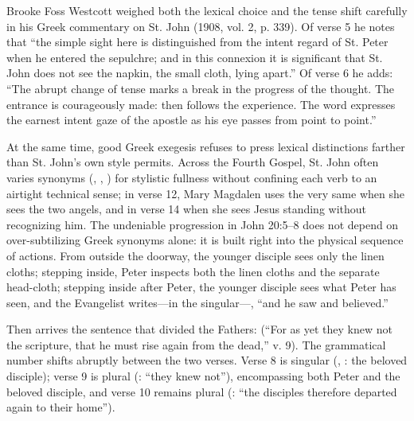 Brooke Foss Westcott weighed both the lexical choice and the tense shift carefully in his Greek commentary on St. John (1908, vol. 2, p. 339). Of verse 5 he notes that ``the simple sight here is distinguished from the intent regard of St. Peter when he entered the sepulchre; and in this connexion it is significant that St. John does not see the napkin, the small cloth, lying apart.'' Of verse 6 he adds: ``The abrupt change of tense marks a break in the progress of the thought. The entrance is courageously made: then follows the experience. The word expresses the earnest intent gaze of the apostle as his eye passes from point to point.''

At the same time, good Greek exegesis refuses to press lexical distinctions farther than St. John's own style permits. Across the Fourth Gospel, St. John often varies synonyms (, , ) for stylistic fullness without confining each verb to an airtight technical sense; in verse 12, Mary Magdalen uses the very same  when she sees the two angels, and in verse 14 when she sees Jesus standing without recognizing him. The undeniable progression in John 20:5--8 does not depend on over-subtilizing Greek synonyms alone: it is built right into the physical sequence of actions. From outside the doorway, the younger disciple sees only the linen cloths; stepping inside, Peter inspects both the linen cloths and the separate head-cloth; stepping inside after Peter, the younger disciple sees what Peter has seen, and the Evangelist writes---in the singular---, ``and he saw and believed.''

Then arrives the sentence that divided the Fathers:  (``For as yet they knew not the scripture, that he must rise again from the dead,'' v. 9). The grammatical number shifts abruptly between the two verses. Verse 8 is singular (, : the beloved disciple); verse 9 is plural (: ``they knew not''), encompassing both Peter and the beloved disciple, and verse 10 remains plural (: ``the disciples therefore departed again to their home'').

